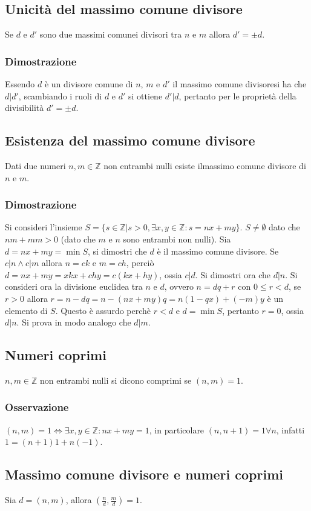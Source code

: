 \subsection{Unicit\`a del massimo comune divisore}
Se $d$ e $d'$ sono due massimi comunei divisori tra $n$ e $m$ allora $d'=\pm d$.
\subsubsection{Dimostrazione}
Essendo $d$ \`e un divisore comune di $n$, $m$ e  $d'$ il massimo comune divisoresi ha che $d|d'$, scambiando i ruoli di $d$ e $d'$ si ottiene $d'|d$, pertanto per le propriet\`a della divisibilit\`a $d'=\pm 
d$.
\subsection{Esistenza del massimo comune divisore}
Dati due numeri $n, m\in\mathbb{Z}$ non entrambi nulli esiste ilmassimo comune divisore di $n$ e $m$. 
\subsubsection{Dimostrazione}
Si consideri l'insieme $S=\{s\in\mathbb{Z}|s>0, \exists x,y\in\mathbb{Z}:s=nx+my\}$. $S\neq\emptyset$ dato che $nm+mm>0$ (dato che $m$ e $n$ sono entrambi non nulli). Sia $d=nx+my=\min S$, si 
dimostri che $d$ \`e il massimo comune divisore. Se $c|n\wedge c|m$ allora $n=ck$ e $m=ch$, perci\`o $d=nx+my=xkx+chy=c(kx+hy)$, ossia $c|d$. Si dimostri ora che $d|n$. Si consideri ora la divisione
euclidea tra $n$ e $d$, ovvero $n=dq+r$ con $0\le r<d$, se $r>0$ allora $r=n-dq=n-(nx+my)q=n(1-qx)+(-m)y$ \`e un elemento di $S$. Questo \`e assurdo perch\`e $r<d$ e $d=\min S$, pertanto $r=0$, 
ossia $d|n$. Si prova in modo analogo che $d|m$. 
\subsection{Numeri coprimi}
$n,m\in\mathbb{Z}$ non entrambi nulli si dicono comprimi se $(n,m)=1$.
\subsubsection{Osservazione}
$(n,m)=1\Leftrightarrow\exists x,y\in\mathbb{Z}: nx+my=1$, in particolare $(n,n+1)=1\forall n$, infatti $1=(n+1)1+n(-1)$.
\subsection{Massimo comune divisore e numeri coprimi}
Sia $d=(n,m)$, allora $(\frac{n}{d},\frac{m}{d})=1$.
